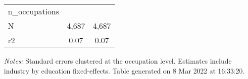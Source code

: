 \begin{center}
\begin{threeparttable}[!h]
\begin{tabular}{lcc}
n\_occupations       &            &            \\
N                   &       4,687&       4,687\\
r2                  &        0.07&        0.07\\
\bottomrule
\bottomrule
\end{tabular}
\begin{tablenotes}
\item \footnotesize \textit{Notes:} Standard errors clustered at the occupation level. Estimates include industry by education fixed-effects. Table generated on  8 Mar 2022 at 16:33:20.
\end{tablenotes}
\end{threeparttable}
\end{center}
